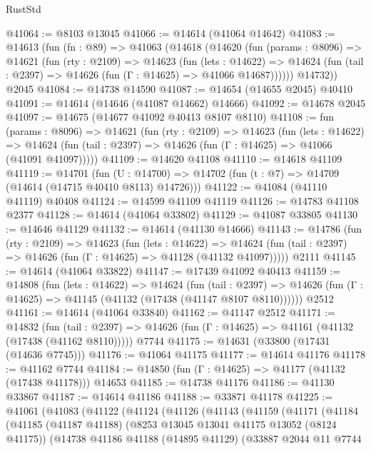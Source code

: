 \begin{lexlean}{RustStd}
\begin{coremodule}
@41064 := @8103 @13045
@41066 := @14614 (@41064 @14642)
@41083 := @14613
    (fun (fn : @89) =>
    @41063
      (@14618
        (@14620
          (fun (params : @8096) =>
          @14621
            (fun (rty : @2109) =>
            @14623
              (fun (lets : @14622) =>
              @14624 (fun (tail : @2397) => @14626 (fun (Γ : @14625) => @41066 @14687))))))
        @14732))
    @2045
@41084 := @14738 @14590
@41087 := @14654 (@14655 @2045) @40410
@41091 := @14614 (@14646 (@41087 @14662) @14666)
@41092 := @14678 @2045
@41097 := @14675 (@14677 @41092 @40413 @8107 @8110)
@41108 := fun (params : @8096) =>
  @14621
    (fun (rty : @2109) =>
    @14623
      (fun (lets : @14622) =>
      @14624 (fun (tail : @2397) => @14626 (fun (Γ : @14625) => @41066 (@41091 @41097)))))
@41109 := @14620 @41108
@41110 := @14618 @41109
@41119 := @14701
    (fun (U : @14700) => @14702 (fun (t : @7) => @14709 (@14614 (@14715 @40410 @8113) @14726)))
@41122 := @41084 (@41110 @41119) @40408
@41124 := @14599 @41109 @41119
@41126 := @14783 @41108 @2377
@41128 := @14614 (@41064 @33802)
@41129 := @41087 @33805
@41130 := @14646 @41129
@41132 := @14614 (@41130 @14666)
@41143 := @14786
    (fun (rty : @2109) =>
    @14623
      (fun (lets : @14622) =>
      @14624 (fun (tail : @2397) => @14626 (fun (Γ : @14625) => @41128 (@41132 @41097)))))
    @2111
@41145 := @14614 (@41064 @33822)
@41147 := @17439 @41092 @40413
@41159 := @14808
    (fun (lets : @14622) =>
    @14624
      (fun (tail : @2397) =>
      @14626 (fun (Γ : @14625) => @41145 (@41132 (@17438 (@41147 @8107 @8110))))))
    @2512
@41161 := @14614 (@41064 @33840)
@41162 := @41147 @2512
@41171 := @14832
    (fun (tail : @2397) => @14626 (fun (Γ : @14625) => @41161 (@41132 (@17438 (@41162 @8110)))))
    @7744
@41175 := @14631 (@33800 (@17431 (@14636 @7745)))
@41176 := @41064 @41175
@41177 := @14614 @41176
@41178 := @41162 @7744
@41184 := @14850 (fun (Γ : @14625) => @41177 (@41132 (@17438 @41178))) @14653
@41185 := @14738 @41176
@41186 := @41130 @33867
@41187 := @14614 @41186
@41188 := @33871 @41178
@41225 := @41061
    (@41083
      (@41122
        (@41124
          (@41126
            (@41143
              (@41159
                (@41171
                  (@41184
                    (@41185
                      (@41187 @41188)
                      (@8253 @13045 @13041 @41175 @13052 (@8124 @41175))
                      (@14738
                        @41186
                        @41188
                        (@14895 @41129)
                        (@33887
                          @2044
                          @11
                          @7744

\end{coremodule}
\end{lexlean}

